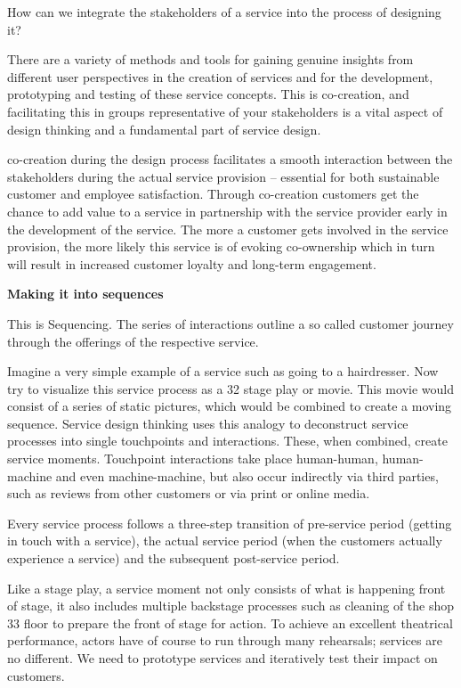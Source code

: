 How can we integrate the stakeholders of a service into the process of designing it?

There are a variety of methods and tools for gaining genuine insights from different user perspectives in the creation of services and for the development, prototyping and testing of these service concepts. This is co-creation, and facilitating this in groups representative of your stakeholders is a vital aspect of design thinking and a fundamental part of service design.

co-creation during the design process facilitates a smooth interaction between the stakeholders during the actual service provision – essential for both sustainable customer and employee satisfaction. Through co-creation customers get the chance to add value to a service in partnership with the service provider early in the development of the service. The more a customer gets involved in the service provision, the more likely this service is of evoking co-ownership which in turn will result in increased customer loyalty and long-term engagement.

\textbf{Making it into sequences} %

This is Sequencing.
The series of interactions outline a so called customer journey through the offerings of the respective service.

Imagine a very simple example of a service such as going to a hairdresser. Now try to visualize this service process as a
32
stage play or movie. This movie would consist of a series of static pictures, which would be combined to create a moving sequence. Service design thinking uses this analogy to deconstruct service processes into single touchpoints and interactions. These, when combined, create service moments. Touchpoint interactions take place human-human, human-machine and even machine-machine, but also occur indirectly via third parties, such as reviews from other customers or via print or online media.

Every service process follows a three-step transition of pre-service period (getting in touch with a service), the actual service period (when the customers actually experience a service) and the subsequent post-service period.

Like a stage play, a service moment not only consists of what is happening front of stage, it also includes multiple backstage processes such as cleaning of the shop
33
floor to prepare the front of stage for action. To achieve an excellent theatrical performance, actors have of course to run through many rehearsals; services are no different. We need to prototype services and iteratively test their impact on customers.


